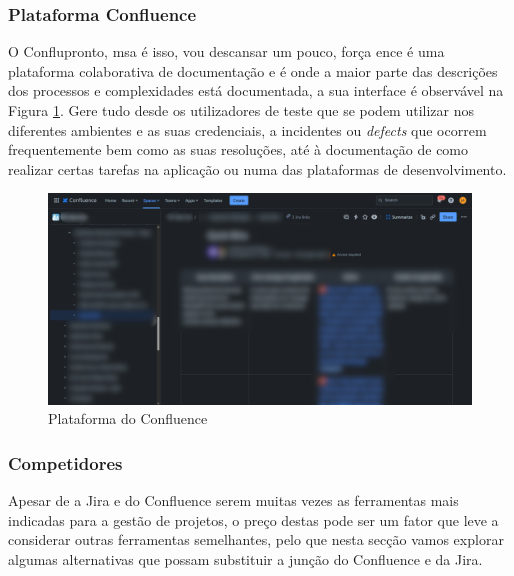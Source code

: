         \subsubsection{Plataforma Confluence}\label{secsec:confluence}

            O Conflupronto, msa é isso, vou descansar um pouco, força ence é uma plataforma colaborativa de documentação e é onde a maior parte das descrições dos processos e complexidades está documentada, a sua interface é observável na Figura \ref{fig:confluence-ui}. Gere tudo desde os utilizadores de teste que se podem utilizar nos diferentes ambientes e as suas credenciais, a incidentes ou \textit{defects} que ocorrem frequentemente bem como as suas resoluções, até à documentação de como realizar certas tarefas na aplicação ou numa das plataformas de desenvolvimento.
            
            \begin{figure}[htbp]
                \centering
                \includegraphics[width=\textwidth]{imgs/Confluence.png}
                \caption{Plataforma do Confluence}\label{fig:confluence-ui}
            \end{figure}

        
        \subsubsection{Competidores}\label{competidores-jira-confluence}

            Apesar de a Jira e do Confluence serem muitas vezes as ferramentas mais indicadas para a gestão de projetos, o preço destas pode ser um fator que leve a considerar outras ferramentas semelhantes, pelo que nesta secção vamos explorar algumas alternativas que possam substituir a junção do Confluence e da Jira.

